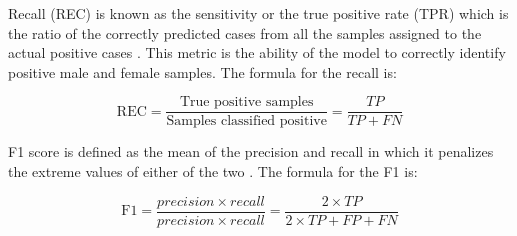Recall (REC) is known as the sensitivity or the true positive rate (TPR) which is the ratio of the correctly predicted cases from all the samples assigned to the actual positive cases \cite{cui2020}. This metric is the ability of the model to correctly identify positive male and female samples. The formula for the recall is:

\begin{equation}
	\text{REC} = \frac{\text{True positive samples}} {\text{Samples classified positive}} = \frac{TP}{TP + FN}
	\label{eq:rec}
\end{equation}

F1 score is defined as the mean of the precision and recall in which it penalizes the extreme values of either of the two \cite{cui2020}. The formula for the F1 is: 

\begin{equation}
	\text{F1} = \frac{ precision \times recall }{precision \times recall }= \frac{2 \times TP}{2 \times TP + FP + FN}
	\label{eq:f1}
\end{equation}




